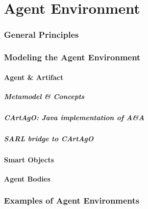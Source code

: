 \part[author={Prof.Dr. St\'ephane GALLAND}]{Agent Environment}
\begin{bibliographysection}

	\section{General Principles}
	

	\section{Modeling the Agent Environment}

	\subsection{Agent \& Artifact}
	\subsubsection{Metamodel \& Concepts}
	
	\subsubsection{{CArtAgO:} Java implementation of A\&A}
	
	\subsubsection{SARL bridge to {CArtAgO}}
	

	\subsection{Smart Objects}
	

	\subsection{Agent Bodies}
	

	\section{Examples of Agent Environments}
	

\end{bibliographysection}

